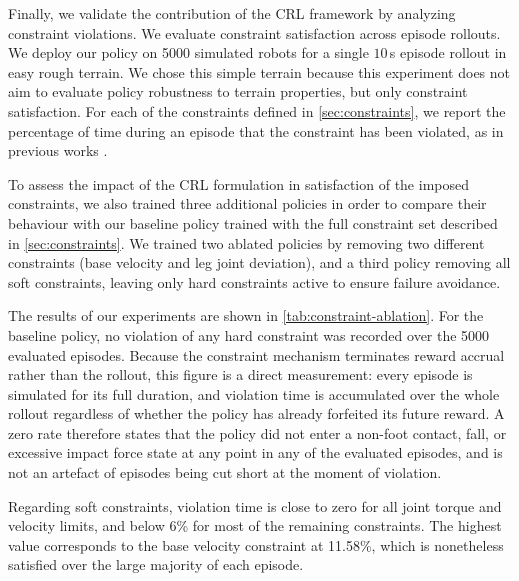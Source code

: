 Finally, we validate the contribution of the CRL framework by analyzing constraint violations. We evaluate constraint satisfaction across episode rollouts. We deploy our policy on 5000 simulated robots for a single $10\,$s episode rollout in easy rough terrain. We chose this simple terrain because this experiment does not aim to evaluate policy robustness to terrain properties, but only constraint satisfaction. For each of the constraints defined in \cref{sec:constraints}, we report the percentage of time during an episode that the constraint has been violated, as in previous works \citep{chane2024cat, chanesane2024solo, belmonte2025isparo}.

To assess the impact of the CRL formulation in satisfaction of the imposed constraints, we also trained three additional policies in order to compare their behaviour with our baseline policy trained with the full constraint set described in \cref{sec:constraints}. We trained two ablated policies by removing two different constraints (base velocity and leg joint deviation), and a third policy removing all soft constraints, leaving only hard constraints active to ensure failure avoidance. 

The results of our experiments are shown in \cref{tab:constraint-ablation}. For the
baseline policy, no violation of any hard constraint was recorded over the 5000
evaluated episodes. Because the constraint mechanism terminates reward accrual rather
than the rollout, this figure is a direct measurement: every episode is simulated for
its full duration, and violation time is accumulated over the whole rollout regardless
of whether the policy has already forfeited its future reward. A zero rate therefore
states that the policy did not enter a non-foot contact, fall, or excessive impact
force state at any point in any of the evaluated episodes, and is not an artefact of
episodes being cut short at the moment of violation.

Regarding soft constraints, violation time is close to zero for all joint torque and
velocity limits, and below 6\% for most of the remaining constraints. The highest value
corresponds to the base velocity constraint at 11.58\%, which is nonetheless satisfied
over the large majority of each episode.

